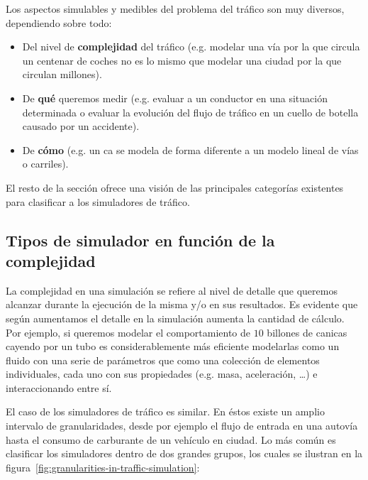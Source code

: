 Los aspectos simulables y medibles del problema del tráfico son muy diversos, dependiendo sobre todo:

\begin{itemize}
	\item Del nivel de \textbf{complejidad} del tráfico (e.g. modelar una vía por la que circula un centenar de coches no es lo mismo que modelar una ciudad por la que circulan millones).
	\item De \textbf{qué} queremos medir (e.g. evaluar a un conductor en una situación determinada o evaluar la evolución del flujo de tráfico en un cuello de botella causado por un accidente).
	\item De \textbf{cómo} (e.g. un \ac{ca} se modela de forma diferente a un modelo lineal de vías o carriles).
\end{itemize}

El resto de la sección ofrece una visión de las principales categorías existentes para clasificar a los simuladores de tráfico.

\subsection{Tipos de simulador en función de la complejidad}

La complejidad en una simulación se refiere al nivel de detalle que queremos alcanzar durante la ejecución de la misma y/o en sus resultados. Es evidente que según aumentamos el detalle en la simulación aumenta la cantidad de cálculo. Por ejemplo, si queremos modelar el comportamiento de $10$ billones de canicas cayendo por un tubo es considerablemente más eficiente modelarlas como un fluido con una serie de parámetros que como una colección de elementos individuales, cada uno con sus propiedades (e.g. masa, aceleración, \ldots) e interaccionando entre sí.

El caso de los simuladores de tráfico es similar. En éstos existe un amplio intervalo de granularidades, desde por ejemplo el flujo de entrada en una autovía hasta el consumo de carburante de un vehículo en ciudad. Lo más común es clasificar los simuladores dentro de dos grandes grupos, los cuales se ilustran en la figura~\ref{fig:granularities-in-traffic-simulation}:

